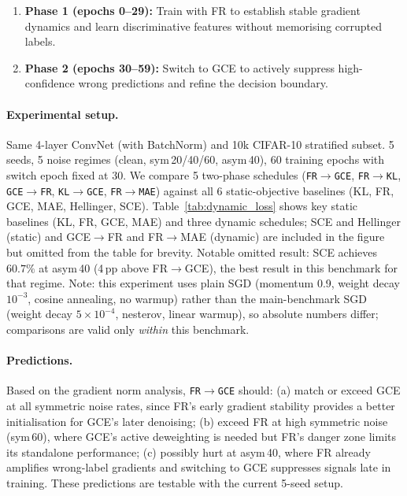 \documentclass[11pt]{article}
\begin{document}
\begin{enumerate}
  \item \textbf{Phase 1 (epochs 0--29):} Train with FR to establish stable
    gradient dynamics and learn discriminative features without memorising
    corrupted labels.
  \item \textbf{Phase 2 (epochs 30--59):} Switch to GCE to actively suppress
    high-confidence wrong predictions and refine the decision boundary.
\end{enumerate}

\paragraph{Experimental setup.}
Same 4-layer ConvNet (with BatchNorm) and 10k CIFAR-10 stratified subset.
5 seeds, 5 noise regimes (clean, sym\,20/40/60, asym\,40), 60 training epochs with
switch epoch fixed at 30.
We compare 5 two-phase schedules (\texttt{FR$\to$GCE}, \texttt{FR$\to$KL},
\texttt{GCE$\to$FR}, \texttt{KL$\to$GCE}, \texttt{FR$\to$MAE}) against
all 6 static-objective baselines (KL, FR, GCE, MAE, Hellinger, SCE).
Table~\ref{tab:dynamic_loss} shows key static baselines (KL, FR, GCE, MAE) and
three dynamic schedules; SCE and Hellinger (static) and GCE$\to$FR and
FR$\to$MAE (dynamic) are included in the figure but omitted from the table for
brevity. Notable omitted result: SCE achieves $60.7\%$ at asym\,40
(4\,pp above FR$\to$GCE), the best result in this benchmark for that regime.
Note: this experiment uses plain SGD (momentum 0.9, weight decay $10^{-3}$, cosine
annealing, no warmup) rather than the main-benchmark SGD (weight decay $5\times10^{-4}$,
nesterov, linear warmup), so absolute numbers differ; comparisons are valid only
\emph{within} this benchmark.

\paragraph{Predictions.}
Based on the gradient norm analysis, \texttt{FR$\to$GCE} should:
(a) match or exceed GCE at all symmetric noise rates, since FR's early
gradient stability provides a better initialisation for GCE's later denoising;
(b) exceed FR at high symmetric noise (sym\,60), where GCE's active deweighting
is needed but FR's danger zone limits its standalone performance;
(c) possibly hurt at asym\,40, where FR already amplifies wrong-label gradients
and switching to GCE suppresses signals late in training.
These predictions are testable with the current 5-seed setup.
\end{document}
